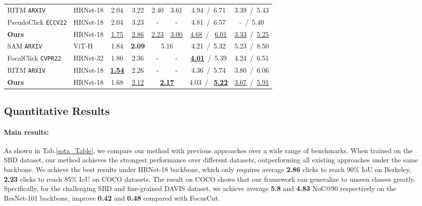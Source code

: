 \documentclass{bmvc2k}
\begin{document}
\begin{table*}[t]
{\begin{tabular}{ll|cccccc}
    RITM\cite{sofiiuk2021reviving} \scriptsize{\texttt{ARXIV}}                  & HRNet-18        & 2.04 & 3.22   & 2.40    & 3.61   & 4.94~/~6.71 &  3.39~/~5.43  \\
    PseudoClick\cite{liu2022pseudoclick} \scriptsize{\texttt{ECCV22}} & HRNet-18 & 2.04 & 3.23 & - & - & 4.81~/~6.57 & -~/~5.40 \\
    \textbf{Ours}                                                & HRNet-18        & \underline{1.75} & \underline{2.86} & \underline{2.23} & \underline{3.00} & \underline{4.68}~/~ \underline{6.01} &  \underline{3.33}~/~\underline{5.25} \\ \midrule
    SAM\cite{kirillov2023segment} \scriptsize{\texttt{ARXIV}}                 & ViT-H        & 1.84 & \textbf{2.09}   & \multicolumn{2}{c}{5.16}    & 4.21~/~5.32 & 5.23~/~8.50  \\ \midrule
    FocalClick\cite{Chen_2022_CVPR} \scriptsize{\texttt{CVPR22}} & HRNet-32 & 1.80 & 2.36 & - & - & \underline{\textbf{4.01}}~/~5.39 & 4.24~/~6.51 \\
    RITM\cite{sofiiuk2021reviving} \scriptsize{\texttt{ARXIV}}                 & HRNet-18        & \underline{\textbf{1.54}} & 2.26   & -    & -    & 4.36~/~5.74 &  3.80~/~6.06  \\
    \textbf{Ours}                                                 & HRNet-18        & 1.68 & \underline{2.12} & \multicolumn{2}{c}{\textbf{\underline{2.17}}} & 4.03~/~ \underline{\textbf{5.22}} &  \underline{3.67}~/~\underline{5.91} \\    
    \bottomrule[1pt]
    \end{tabular}}

\end{table*}



\subsection{Quantitative Results}



\paragraph{\textbf{Main results:}} 
As shown in Tab.\ref{sota_Table}, we compare our method with previous approaches over a wide range of benchmarks. When trained on the SBD dataset, our method achieves the strongest performance over different datasets, outperforming all existing approaches under the same backbone. We achieve the best results under HRNet-18 backbone, which only requires average \textbf{2.86} clicks to reach 90\% IoU on Berkeley, \textbf{2.23} clicks to reach 85\% IoU on COCO datasets. The result on COCO shows that our framework can generalize to unseen classes greatly. Specifically, for the challenging SBD and fine-grained DAVIS dataset, we achieve average \textbf{5.8} and \textbf{4.83} NoC@90 respectively on the ResNet-101 backbone, improve \textbf{0.42} and \textbf{0.48} compared with FocusCut. 
\end{document}
